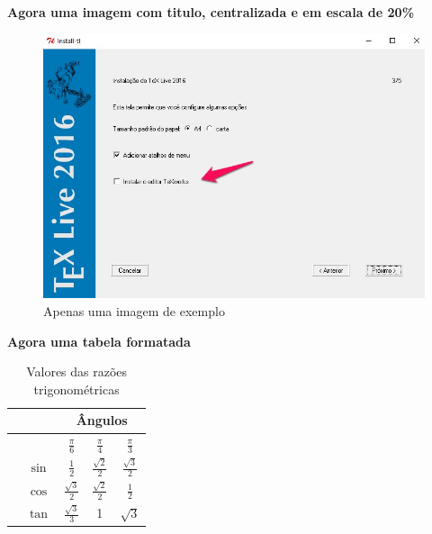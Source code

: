 \documentclass{article}
\begin{document}
\textbf{Agora uma imagem com titulo, centralizada e em escala de 20\%}

\begin{figure}[H]
  \centering
  \includegraphics[scale=0.2]{docs/texlive-install.jpg}
  \caption{Apenas uma imagem de exemplo}
  \label{fig:um_exemplo}
\end{figure}

\centering
\textbf{Agora uma tabela formatada}


\begin{table}[H]
	\centering
	\begin{tabular}{>{\centering}m{2cm}cccc}
		\toprule[2pt]
		&  & \multicolumn{3}{c}{Ângulos} \\ 
		\cmidrule[.1pt]{3-5}
		&  & $\frac{\pi}{6}$ & $\frac{\pi}{4}$ & $\frac{\pi}{3}$ \\ 
		\cmidrule[.1pt]{2-5} 
		\multirow{3}{*}{\rotatebox[origin=c]{90}{\parbox{2.2cm}{\centering Razões\\ Trigonométricas}}} & $\sin$ & $\frac{1}{2}$ & $\frac{\sqrt{2}}{2}$ & $\frac{\sqrt{3}}{2}$ \\ 
		\cmidrule[.1pt]{2-5}
		& $\cos$ & $\frac{\sqrt{3}}{2}$ & $\frac{\sqrt{2}}{2}$ & $\frac{1}{2}$ \\ 
		\cmidrule[.1pt]{2-5}
		& $\tan$ & $\frac{\sqrt{3}}{3}$ & 1 & $\sqrt{3}$ \\ 
		\bottomrule[2pt]
	\end{tabular}
	\caption{Valores das razões trigonométricas}
\end{table}
\end{document}
